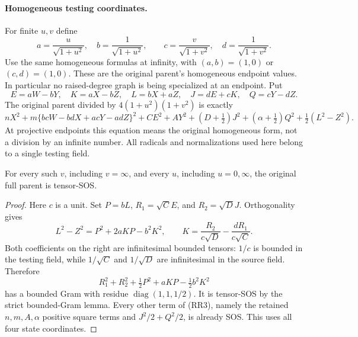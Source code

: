 \paragraph{Homogeneous testing coordinates.}
For finite $u,v$ define
\[
 a=\frac{u}{\sqrt{1+u^2}},\quad b=\frac1{\sqrt{1+u^2}},\qquad
 c=\frac{v}{\sqrt{1+v^2}},\quad d=\frac1{\sqrt{1+v^2}}.
\]
Use the same homogeneous formulas at infinity, with $(a,b)=(1,0)$
or $(c,d)=(1,0)$.  These are the original parent's homogeneous
endpoint values.  In particular no raised-degree graph is being
specialized at an endpoint.  Put
\[
 E=aW-bY,\quad K=aX-bZ,\quad L=bX+aZ,
 \quad J=dE+cK,\quad Q=cY-dZ.
\]
The original parent divided by $4(1+u^2)(1+v^2)$ is exactly
\[
 nX^2+m\{bcW-bdX+acY-adZ\}^2+CE^2+AY^2
 +(D+\tfrac12)J^2+(\alpha+\tfrac12)Q^2
 +\tfrac12(L^2-Z^2).                                    \tag{RR3}
\]
At projective endpoints this equation means the original homogeneous
form, not a division by an infinite number.  All radicals and
normalizations used here belong to a single testing field.

\begin{proposition}
For every such $v$, including $v=\infty$, and every $u$, including
$u=0,\infty$, the original full parent is tensor-SOS.
\end{proposition}
\begin{proof}
Here $c$ is a unit.  Set $P=bL$, $R_1=\sqrt C E$, and
$R_2=\sqrt D J$.  Orthogonality gives
\[
 L^2-Z^2=P^2+2aKP-b^2K^2,
 \qquad
 K=\frac{R_2}{c\sqrt D}-\frac{dR_1}{c\sqrt C}.            \tag{RR4}
\]
Both coefficients on the right are infinitesimal bounded tensors:
$1/c$ is bounded in the testing field, while $1/\sqrt C$ and
$1/\sqrt D$ are infinitesimal in the source field.  Therefore
\[
 R_1^2+R_2^2+\tfrac12P^2+aKP-\tfrac12b^2K^2
\]
has a bounded Gram with residue $\operatorname{diag}(1,1,1/2)$.
It is tensor-SOS by the strict bounded-Gram lemma.  Every other term
of (RR3), namely the retained $n,m,A,\alpha$ positive square terms and
$J^2/2+Q^2/2$, is already SOS.  This uses all four state coordinates.
\end{proof}

